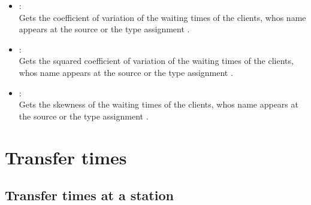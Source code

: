 \begin{itemize}
\item
{}:\\
Gets the coefficient of variation of the waiting times of the clients, whos name appears at the source or the type assignment .

\item
{}:\\
Gets the squared coefficient of variation of the waiting times of the clients, whos name appears at the source or the type assignment .

\item
{}:\\
Gets the skewness of the waiting times of the clients, whos name appears at the source or the type assignment .

\end{itemize}



\section{Transfer times}



\subsection{Transfer times at a station}

